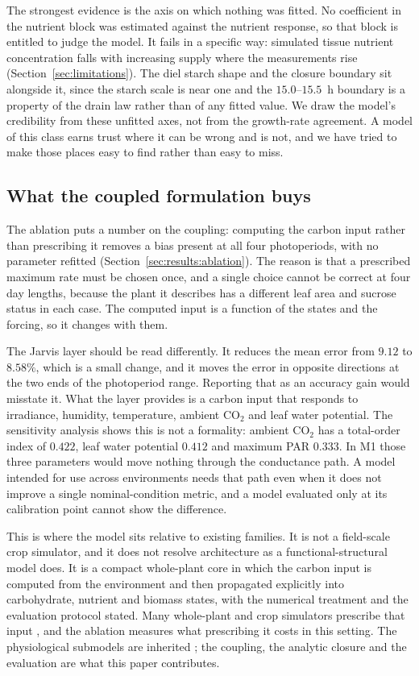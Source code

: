 The strongest evidence is the axis on which nothing was fitted. No coefficient in
the nutrient block was estimated against the nutrient response, so that block is
entitled to judge the model. It fails in a specific way: simulated tissue
nutrient concentration falls with increasing supply where the measurements rise
(Section~\ref{sec:limitations}). The diel starch shape and the closure boundary
sit alongside it, since the starch scale is near one and the $15.0$--$15.5$~h
boundary is a property of the drain law rather than of any fitted value. We draw
the model's credibility from these unfitted axes, not from the growth-rate
agreement. A model of this class earns trust where it can be wrong and is not, and
we have tried to make those places easy to find rather than easy to miss.

\subsection{What the coupled formulation buys}

The ablation puts a number on the coupling: computing the carbon input rather
than prescribing it removes a bias present at all four photoperiods, with no
parameter refitted (Section~\ref{sec:results:ablation}). The reason is that a
prescribed maximum rate must be chosen once, and a single choice cannot be
correct at four day lengths, because the plant it describes has a different leaf
area and sucrose status in each case. The computed input is a function of the
states and the forcing, so it changes with them.

The Jarvis layer should be read differently. It reduces the mean error from
$9.12$ to $8.58\%$, which is a small change, and it moves the error in opposite
directions at the two ends of the photoperiod range. Reporting that as an
accuracy gain would misstate it. What the layer provides is a carbon input that
responds to irradiance, humidity, temperature, ambient CO$_2$ and leaf water
potential. The sensitivity analysis shows this is not a formality: ambient
CO$_2$ has a total-order index of $0.422$, leaf water potential $0.412$ and
maximum PAR $0.333$. In M1 those three parameters would move nothing through
the conductance path. A model intended for use across environments needs that
path even when it does not improve a single nominal-condition metric, and a
model evaluated only at its calibration point cannot show the difference.

This is where the model sits relative to existing families. It is not a
field-scale crop simulator, and it does not resolve architecture as a
functional-structural model does. It is a compact whole-plant core in which the
carbon input is computed from the environment and then propagated explicitly
into carbohydrate, nutrient and biomass states, with the numerical treatment and
the evaluation protocol stated. Many whole-plant and crop simulators prescribe
that input \citep{Holzworth2014,Jones2003,deWit2019}, and the ablation measures
what prescribing it costs in this setting. The physiological submodels are
inherited \citep{Farquhar1980,Jarvis1976,vonCaemmerer2000}; the coupling, the
analytic closure and the evaluation are what this paper contributes.

